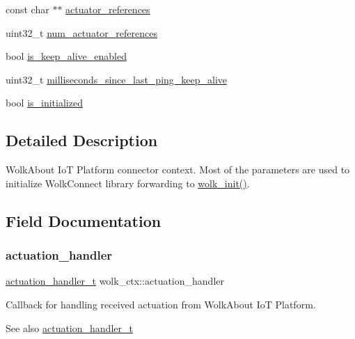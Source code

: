 \begin{DoxyCompactItemize}
\item 
const char $\ast$$\ast$ \hyperlink{structwolk__ctx_aa2127e8414d0d9c6214343891f4a322f}{actuator\+\_\+references}
\item 
uint32\+\_\+t \hyperlink{structwolk__ctx_a23e98a97649d679e4a85c87f2da1f8e5}{num\+\_\+actuator\+\_\+references}
\item 
bool \hyperlink{structwolk__ctx_ab195921b22d85b2e46df09cca001f5e2}{is\+\_\+keep\+\_\+alive\+\_\+enabled}
\item 
uint32\+\_\+t \hyperlink{structwolk__ctx_a2d93b135a08863cedae25012a6dc8d46}{milliseconds\+\_\+since\+\_\+last\+\_\+ping\+\_\+keep\+\_\+alive}
\item 
bool \hyperlink{structwolk__ctx_ae0a13a533a7c9ffc516eda95cd6ed324}{is\+\_\+initialized}
\end{DoxyCompactItemize}


\subsection{Detailed Description}
Wolk\+About IoT Platform connector context. Most of the parameters are used to initialize Wolk\+Connect library forwarding to \hyperlink{wolk__connector_8h_a607b5439ae7741284a73312b7794fa7a}{wolk\+\_\+init()}. 

\subsection{Field Documentation}
\mbox{\label{structwolk__ctx_a2ab241133283e361c6822409f7ec48ca}} 
\subsubsection{\texorpdfstring{actuation\+\_\+handler}{actuation\_handler}}
{\footnotesize\ttfamily \hyperlink{wolk__connector_8h_acde87869e807b1774680f3f2b5b04e2f}{actuation\+\_\+handler\+\_\+t} wolk\+\_\+ctx\+::actuation\+\_\+handler}

Callback for handling received actuation from Wolk\+About IoT Platform. \begin{DoxySeeAlso}{See also}
\hyperlink{wolk__connector_8h_acde87869e807b1774680f3f2b5b04e2f}{actuation\+\_\+handler\+\_\+t} 
\end{DoxySeeAlso}
\mbox{\label{structwolk__ctx_aa2127e8414d0d9c6214343891f4a322f}} 
